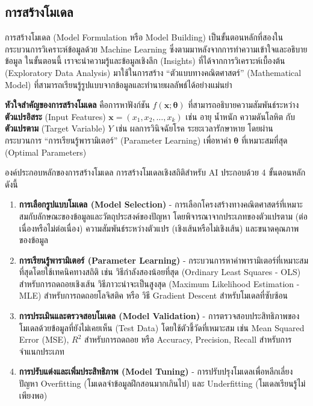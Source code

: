 \subsection{การสร้างโมเดล}
การสร้างโมเดล (Model Formulation หรือ Model Building) เป็นขั้นตอนหลักที่สองในกระบวนการวิเคราะห์ข้อมูลด้วย Machine Learning ซึ่งตามมาหลังจากการทำความเข้าใจและอธิบายข้อมูล ในขั้นตอนนี้ เราจะนำความรู้และข้อมูลเชิงลึก (Insights) ที่ได้จากการวิเคราะห์เบื้องต้น (Exploratory Data Analysis) มาใช้ในการสร้าง ``ตัวแบบทางคณิตศาสตร์'' (Mathematical Model) ที่สามารถเรียนรู้รูปแบบจากข้อมูลและทำนายผลลัพธ์ได้อย่างแม่นยำ

\textbf{หัวใจสำคัญของการสร้างโมเดล} คือการหาฟังก์ชัน $f(\mathbf{x}; \boldsymbol{\theta})$ ที่สามารถอธิบายความสัมพันธ์ระหว่าง \textbf{ตัวแปรอิสระ} (Input Features) $\mathbf{x} = (x_1, x_2, \ldots, x_k)$ เช่น อายุ น้ำหนัก ความดันโลหิต กับ \textbf{ตัวแปรตาม} (Target Variable) $Y$ เช่น ผลการวินิจฉัยโรค ระยะเวลารักษาหาย โดยผ่านกระบวนการ ``การเรียนรู้พารามิเตอร์'' (Parameter Learning) เพื่อหาค่า $\boldsymbol{\theta}$ ที่เหมาะสมที่สุด (Optimal Parameters)

\begin{myBox}[]{องค์ประกอบหลักของการสร้างโมเดล}{}
การสร้างโมเดลเชิงสถิติสำหรับ AI ประกอบด้วย 4 ขั้นตอนหลัก ดังนี้

\begin{enumerate}
	\item \textbf{การเลือกรูปแบบโมเดล (Model Selection)} - การเลือกโครงสร้างทางคณิตศาสตร์ที่เหมาะสมกับลักษณะของข้อมูลและวัตถุประสงค์ของปัญหา โดยพิจารณาจากประเภทของตัวแปรตาม (ต่อเนื่องหรือไม่ต่อเนื่อง) ความสัมพันธ์ระหว่างตัวแปร (เชิงเส้นหรือไม่เชิงเส้น) และขนาดคุณภาพของข้อมูล

	\item \textbf{การเรียนรู้พารามิเตอร์ (Parameter Learning)} - กระบวนการหาค่าพารามิเตอร์ที่เหมาะสมที่สุดโดยใช้เทคนิคทางสถิติ เช่น วิธีกำลังสองน้อยที่สุด (Ordinary Least Squares - OLS) สำหรับการถดถอยเชิงเส้น วิธีภาวะน่าจะเป็นสูงสุด (Maximum Likelihood Estimation - MLE) สำหรับการถดถอยโลจิสติค หรือ วิธี Gradient Descent สำหรับโมเดลที่ซับซ้อน

	\item \textbf{การประเมินและตรวจสอบโมเดล (Model Validation)} - การตรวจสอบประสิทธิภาพของโมเดลด้วยข้อมูลที่ยังไม่เคยเห็น (Test Data) โดยใช้ตัวชี้วัดที่เหมาะสม เช่น Mean Squared Error (MSE), $R^2$ สำหรับการถดถอย หรือ Accuracy, Precision, Recall สำหรับการจำแนกประเภท

	\item \textbf{การปรับแต่งและเพิ่มประสิทธิภาพ (Model Tuning)} - การปรับปรุงโมเดลเพื่อหลีกเลี่ยงปัญหา Overfitting (โมเดลจำข้อมูลฝึกสอนมากเกินไป) และ Underfitting (โมเดลเรียนรู้ไม่เพียงพอ)
\end{enumerate}
\end{myBox}

